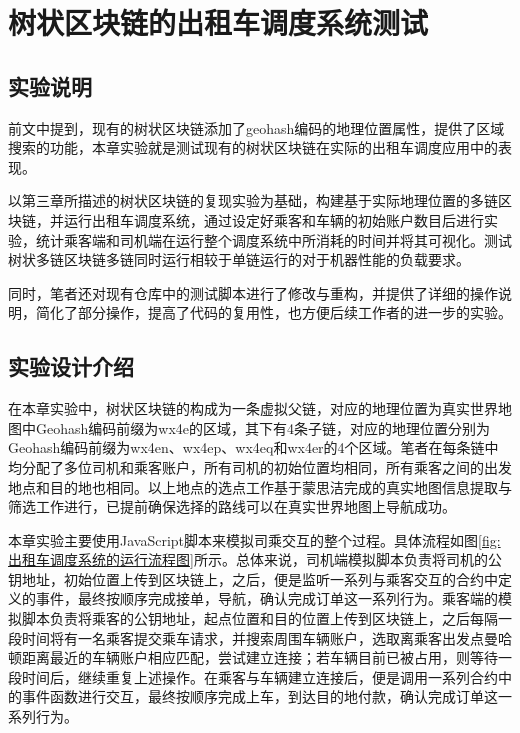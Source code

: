 
\chapter{树状区块链的出租车调度系统测试}

\section{实验说明}

前文中提到，现有的树状区块链添加了geohash编码的地理位置属性，提供了区域搜索的功能，本章实验就是测试现有的树状区块链在实际的出租车调度应用中的表现。

以第三章所描述的树状区块链的复现实验为基础，构建基于实际地理位置的多链区块链，并运行出租车调度系统，通过设定好乘客和车辆的初始账户数目后进行实验，统计乘客端和司机端在运行整个调度系统中所消耗的时间并将其可视化。测试树状多链区块链多链同时运行相较于单链运行的对于机器性能的负载要求。

同时，笔者还对现有仓库中的测试脚本进行了修改与重构，并提供了详细的操作说明，简化了部分操作，提高了代码的复用性，也方便后续工作者的进一步的实验。

\section{实验设计介绍}

在本章实验中，树状区块链的构成为一条虚拟父链，对应的地理位置为真实世界地图中Geohash编码前缀为wx4e的区域，其下有4条子链，对应的地理位置分别为Geohash编码前缀为wx4en、wx4ep、wx4eq和wx4er的4个区域。笔者在每条链中均分配了多位司机和乘客账户，所有司机的初始位置均相同，所有乘客之间的出发地点和目的地也相同。以上地点的选点工作基于蒙思洁完成的真实地图信息提取与筛选工作进行，已提前确保选择的路线可以在真实世界地图上导航成功。

本章实验主要使用JavaScript脚本来模拟司乘交互的整个过程。具体流程如图\ref{fig:出租车调度系统的运行流程图}所示。总体来说，司机端模拟脚本负责将司机的公钥地址，初始位置上传到区块链上，之后，便是监听一系列与乘客交互的合约中定义的事件，最终按顺序完成接单，导航，确认完成订单这一系列行为。乘客端的模拟脚本负责将乘客的公钥地址，起点位置和目的位置上传到区块链上，之后每隔一段时间将有一名乘客提交乘车请求，并搜索周围车辆账户，选取离乘客出发点曼哈顿距离最近的车辆账户相应匹配，尝试建立连接；若车辆目前已被占用，则等待一段时间后，继续重复上述操作。在乘客与车辆建立连接后，便是调用一系列合约中的事件函数进行交互，最终按顺序完成上车，到达目的地付款，确认完成订单这一系列行为。

